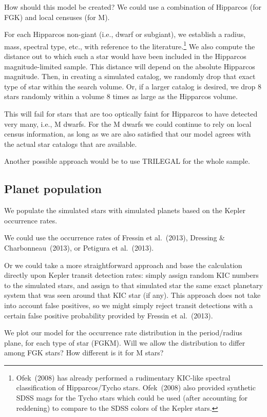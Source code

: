 \documentclass{emulateapj}
\begin{document}
How should this model be created? We could use a combination of
Hipparcos (for FGK) and local censuses (for M).

For each Hipparcos non-giant (i.e., dwarf or subgiant), we establish a
radius, mass, spectral type, etc., with reference to the
literature.\footnote{Ofek~(2008) has already performed a rudimentary
  KIC-like spectral classification of Hipparcos/Tycho
  stars. Ofek~(2008) also provided synthetic SDSS mags for the Tycho
  stars which could be used (after accounting for reddening) to
  compare to the SDSS colors of the Kepler stars.}  We also compute
the distance out to which such a star would have been included in the
Hipparcos magnitude-limited sample. This distance will depend on the
absolute Hipparcos magnitude. Then, in creating a simulated catalog,
we randomly drop that exact type of star within the search volume. Or,
if a larger catalog is desired, we drop 8 stars randomly within a
volume 8 times as large as the Hipparcos volume.

This will fail for stars that are too optically faint for Hipparcos to
have detected very many, i.e., M dwarfs. For the M dwarfs we could
continue to rely on local census information, as long as we are also
satisfied that our model agrees with the actual star catalogs that are
available.

Another possible approach would be to use TRILEGAL for the whole
sample.

\subsection{Planet population}

We populate the simulated stars with simulated planets based on the
Kepler occurrence rates.

We could use the occurrence rates of Fressin et al.\ (2013), Dressing
\& Charbonneau~(2013), or Petigura et al.\ (2013).

Or we could take a more straightforward approach and base the
calculation directly upon Kepler transit detection rates: simply
assign random KIC numbers to the simulated stars, and assign to that
simulated star the same exact planetary system that was seen around
that KIC star (if any).  This approach does not take into account
false positives, so we might simply reject transit detections with a
certain false positive probability provided by Fressin et al.\ (2013).

We plot our model for the occurrence rate distribution in the
period/radius plane, for each type of star (FGKM).  Will we allow the
distribution to differ among FGK stars?  How different is it for M
stars?
\end{document}
